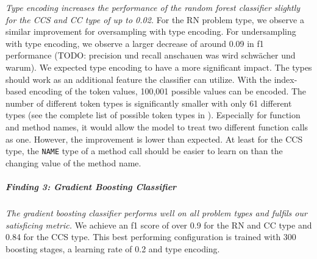\textit{Type encoding increases the performance of the random forest classifier slightly for the CCS and CC type of up to 0.02.} For the RN problem type, we observe a similar improvement for oversampling with type encoding. For undersampling with type encoding, we observe a larger decrease of around 0.09 in f1 performance (TODO: precision und recall anschauen was wird schwächer und warum). 
We expected type encoding to have a more significant impact. The types should work as an additional feature the classifier can utilize. With the index-based encoding of the token values, 100,001 possible values can be encoded. The number of different token types is significantly smaller with only 61 different types (see the complete list of possible token types in ). Especially for function and method names, it would allow the model to treat two different function calls as one. 
However, the improvement is lower than expected. At least for the CCS type, the \texttt{NAME} type of a method call should be easier to learn on than the changing value of the method name.  

\begin{center}
\end{center}

\subparagraph{Finding 3: Gradient Boosting Classifier}\label{finding:rq2_gbc}
\textit{The gradient boosting classifier performs well on all problem types and fulfils our satisficing metric.} We achieve an f1 score of over 0.9 for the RN and CC type and 0.84 for the CCS type. This best performing configuration is trained with 300 boosting stages, a learning rate of 0.2 and type encoding.


